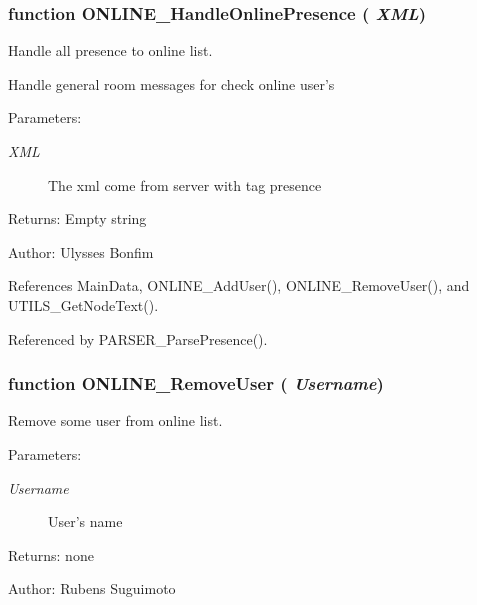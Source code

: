 \subsubsection[ONLINE\_\-HandleOnlinePresence]{\setlength{\rightskip}{0pt plus 5cm}function ONLINE\_\-HandleOnlinePresence ( {\em XML})}\label{online_8js_16f30b5caa3f67caf5184b7498fa850d}


Handle all presence to online list. 

Handle general room messages for check online user's

\begin{Desc}
\item[Parameters:]
\begin{description}
\item[{\em XML}]The xml come from server with tag presence \end{description}
\end{Desc}
\begin{Desc}
\item[Returns:]Empty string \end{Desc}
\begin{Desc}
\item[Author:]Ulysses Bonfim \end{Desc}


References MainData, ONLINE\_\-AddUser(), ONLINE\_\-RemoveUser(), and UTILS\_\-GetNodeText().

Referenced by PARSER\_\-ParsePresence().
\subsubsection[ONLINE\_\-RemoveUser]{\setlength{\rightskip}{0pt plus 5cm}function ONLINE\_\-RemoveUser ( {\em Username})}\label{online_8js_80490d01b1b9677cc2b76c90b0c4c0d0}


Remove some user from online list. 

\begin{Desc}
\item[Parameters:]
\begin{description}
\item[{\em Username}]User's name \end{description}
\end{Desc}
\begin{Desc}
\item[Returns:]none \end{Desc}
\begin{Desc}
\item[Author:]Rubens Suguimoto \end{Desc}


